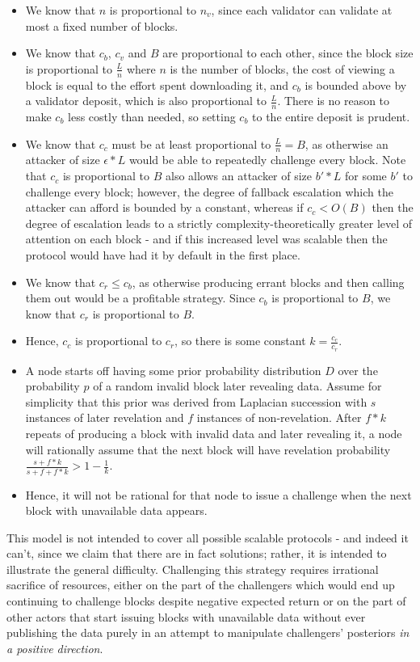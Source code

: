 \documentclass[11pt,a4paper]{report}
\theoremstyle{plain}
\theoremstyle{definition}
\theoremstyle{remark}
\begin{document}
\begin{itemize}
\item
We know that $n$ is proportional to $n_v$, since each validator can validate at most a fixed number of blocks.
\item
We know that $c_b$, $c_v$ and $B$ are proportional to each other, since the block size is proportional to $\frac{L}{n}$ where $n$ is the number of blocks, the cost of viewing a block is equal to the effort spent downloading it, and $c_b$ is bounded above by a validator deposit, which is also proportional to $\frac{L}{n}$. There is no reason to make $c_b$ less costly than needed, so setting $c_b$ to the entire deposit is prudent.
\item
We know that $c_c$ must be at least proportional to $\frac{L}{n} = B$, as otherwise an attacker of size $\epsilon * L$ would be able to repeatedly challenge every block. Note that $c_c$ is proportional to $B$ also allows an attacker of size $b' * L$ for some $b'$ to challenge every block; however, the degree of fallback escalation which the attacker can afford is bounded by a constant, whereas if $c_c < O(B)$ then the degree of escalation leads to a strictly complexity-theoretically greater level of attention on each block - and if this increased level was scalable then the protocol would have had it by default in the first place.
\item
We know that $c_r \le c_b$, as otherwise producing errant blocks and then calling them out would be a profitable strategy. Since $c_b$ is proportional to $B$, we know that $c_r$ is proportional to $B$.
\item
Hence, $c_c$ is proportional to $c_r$, so there is some constant $k = \frac{c_c}{c_r}$.
\item
A node starts off having some prior probability distribution $D$ over the probability $p$ of a random invalid block later revealing data. Assume for simplicity that this prior was derived from Laplacian succession\cite{laplace} with $s$ instances of later revelation and $f$ instances of non-revelation. After $f * k$ repeats of producing a block with invalid data and later revealing it, a node will rationally assume that the next block will have revelation probability $\frac{s + f * k}{s + f + f * k} > 1 - \frac{1}{k}$.
\item
Hence, it will not be rational for that node to issue a challenge when the next block with unavailable data appears.
\end{itemize}

This model is not intended to cover all possible scalable protocols - and indeed it can't, since we claim that there are in fact solutions; rather, it is intended to illustrate the general difficulty. Challenging this strategy requires irrational sacrifice of resources, either on the part of the challengers which would end up continuing to challenge blocks despite negative expected return or on the part of other actors that start issuing blocks with unavailable data without ever publishing the data purely in an attempt to manipulate challengers' posteriors \emph{in a positive direction}.
\end{document}
